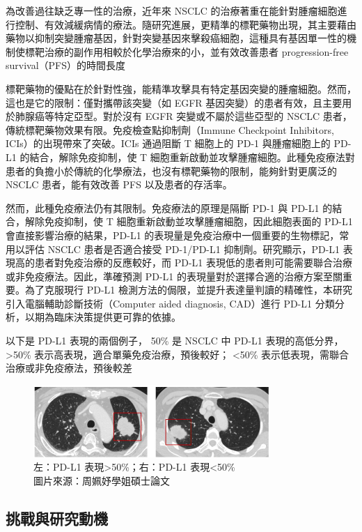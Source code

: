 \documentclass[12pt,a4paper]{article}
\begin{document}
為改善過往缺乏專一性的治療，近年來 NSCLC 的治療著重在能針對腫瘤細胞進行控制、有效減緩病情的療法。隨研究進展，更精準的標靶藥物出現，其主要藉由藥物以抑制突變腫瘤基因，針對突變基因來擊殺癌細胞，這種具有基因單一性的機制使標靶治療的副作用相較於化學治療來的小，並有效改善患者 progression-free survival（PFS）的時間長度

標靶藥物的優點在於針對性強，能精準攻擊具有特定基因突變的腫瘤細胞。然而，這也是它的限制：僅對攜帶該突變（如 EGFR 基因突變）的患者有效，且主要用於肺腺癌等特定亞型。對於沒有 EGFR 突變或不屬於這些亞型的 NSCLC 患者，傳統標靶藥物效果有限。免疫檢查點抑制劑（Immune Checkpoint Inhibitors, ICIs）的出現帶來了突破。ICIs 通過阻斷 T 細胞上的 PD-1 與腫瘤細胞上的 PD-L1 的結合，解除免疫抑制，使 T 細胞重新啟動並攻擊腫瘤細胞。此種免疫療法對患者的負擔小於傳統的化學療法，也沒有標靶藥物的限制，能夠針對更廣泛的 NSCLC 患者，能有效改善 PFS 以及患者的存活率。

然而，此種免疫療法仍有其限制。免疫療法的原理是隔斷 PD-1 與 PD-L1 的結合，解除免疫抑制，使 T 細胞重新啟動並攻擊腫瘤細胞，因此細胞表面的 PD-L1 會直接影響治療的結果，PD-L1 的表現量是免疫治療中一個重要的生物標記，常用以評估 NSCLC 患者是否適合接受 PD-1/PD-L1 抑制劑。研究顯示，PD-L1 表現高的患者對免疫治療的反應較好，而 PD-L1 表現低的患者則可能需要聯合治療或非免疫療法。因此，準確預測 PD-L1 的表現量對於選擇合適的治療方案至關重要。為了克服現行 PD-L1 檢測方法的侷限，並提升表達量判讀的精確性，本研究引入電腦輔助診斷技術（Computer aided diagnosis, CAD）進行 PD-L1 分類分析，以期為臨床決策提供更可靠的依據。

以下是 PD-L1 表現的兩個例子，
50\% 是 NSCLC 中 PD-L1 表現的高低分界，>50\% 表示高表現，適合單藥免疫治療，預後較好；
<50\% 表示低表現，需聯合治療或非免疫療法，預後較差
\begin{figure}[H]
  \centering
  \includegraphics[width=0.8\textwidth]{src/image1.png}
  \centering
  \caption{左：PD-L1 表現>50\%；右：PD-L1 表現<50\%\\圖片來源：周姵妤學姐碩士論文}
  \label{fig:pdl1-examples}
\end{figure}

\subsection{挑戰與研究動機}
\end{document}
